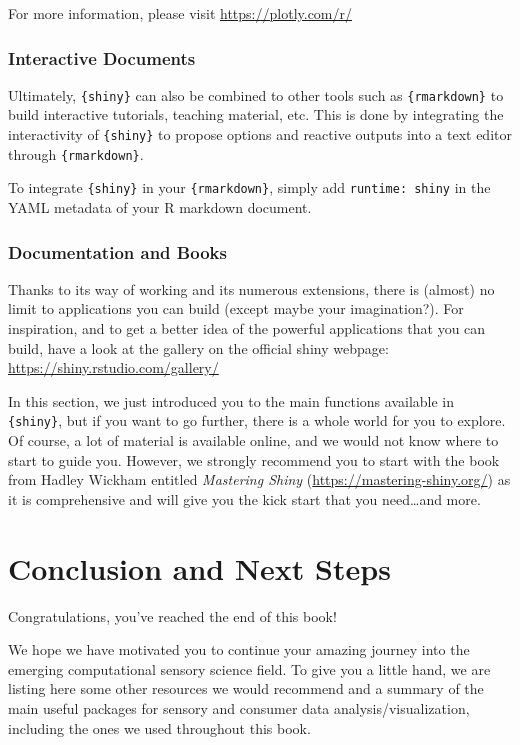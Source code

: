 \documentclass[
]{krantz}
\begin{document}
For more information, please visit \url{https://plotly.com/r/}

\hypertarget{interactive-documents}{%
\subsection{Interactive Documents}\label{interactive-documents}}

Ultimately, \texttt{\{shiny\}} can also be combined to other tools such as \texttt{\{rmarkdown\}} to build interactive tutorials, teaching material, etc. This is done by integrating the interactivity of \texttt{\{shiny\}} to propose options and reactive outputs into a text editor through \texttt{\{rmarkdown\}}.

To integrate \texttt{\{shiny\}} in your \texttt{\{rmarkdown\}}, simply add \texttt{runtime:\ shiny} in the YAML metadata of your R markdown document.

\hypertarget{documentation-and-books}{%
\subsection{Documentation and Books}\label{documentation-and-books}}

Thanks to its way of working and its numerous extensions, there is (almost) no limit to applications you can build (except maybe your imagination?). For inspiration, and to get a better idea of the powerful applications that you can build, have a look at the gallery on the official shiny webpage:
\url{https://shiny.rstudio.com/gallery/}

In this section, we just introduced you to the main functions available in \texttt{\{shiny\}}, but if you want to go further, there is a whole world for you to explore. Of course, a lot of material is available online, and we would not know where to start to guide you. However, we strongly recommend you to start with the book from Hadley Wickham entitled \emph{Mastering Shiny} (\url{https://mastering-shiny.org/}) as it is comprehensive and will give you the kick start that you need\ldots and more.

\hypertarget{next-steps}{%
\chapter{Conclusion and Next Steps}\label{next-steps}}

Congratulations, you've reached the end of this book!

We hope we have motivated you to continue your amazing journey into the emerging computational sensory science field. To give you a little hand, we are listing here some other resources we would recommend and a summary of the main useful packages for sensory and consumer data analysis/visualization, including the ones we used throughout this book.
\end{document}
